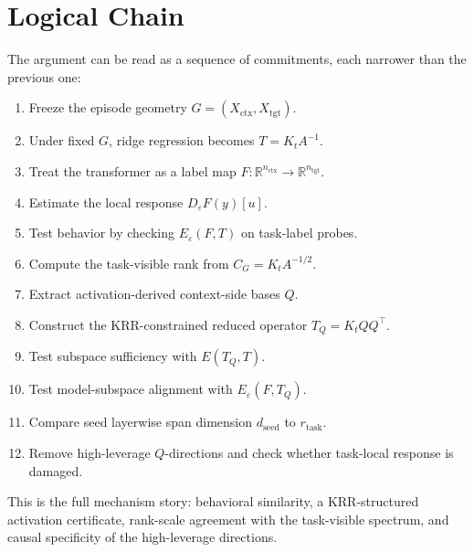 \documentclass[11pt]{article}
\newcommand{\R}{\mathbb{R}}
\begin{document}
\section{Logical Chain}

The argument can be read as a sequence of commitments, each narrower than the previous one:

\begin{enumerate}[label=\arabic*.]
\item Freeze the episode geometry \(G=(X_{\mathrm{ctx}},X_{\mathrm{tgt}})\).
\item Under fixed \(G\), ridge regression becomes \(T=K_tA^{-1}\).
\item Treat the transformer as a label map \(F:\R^{n_{\mathrm{ctx}}}\to\R^{n_{\mathrm{tgt}}}\).
\item Estimate the local response \(D_\varepsilon F(y)[u]\).
\item Test behavior by checking \(E_\varepsilon(F,T)\) on task-label probes.
\item Compute the task-visible rank from \(C_G=K_tA^{-1/2}\).
\item Extract activation-derived context-side bases \(Q\).
\item Construct the KRR-constrained reduced operator \(T_Q=K_tQQ^\top\).
\item Test subspace sufficiency with \(E(T_Q,T)\).
\item Test model-subspace alignment with \(E_\varepsilon(F,T_Q)\).
\item Compare seed layerwise span dimension \(d_{\mathrm{seed}}\) to \(r_{\mathrm{task}}\).
\item Remove high-leverage \(Q\)-directions and check whether task-local response is damaged.
\end{enumerate}

This is the full mechanism story: behavioral similarity, a KRR-structured activation certificate,
rank-scale agreement with the task-visible spectrum, and causal specificity of the high-leverage
directions.
\end{document}
